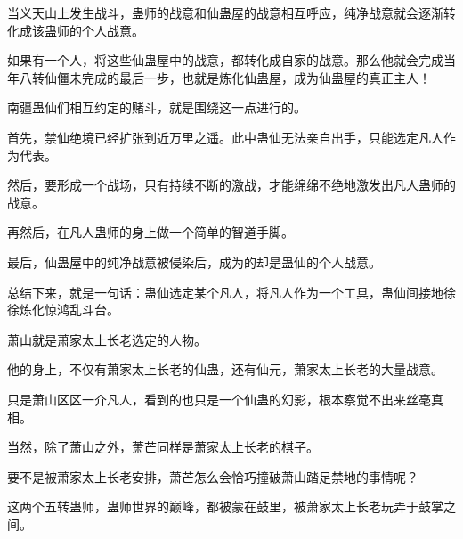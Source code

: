 \begin{this_body}
当义天山上发生战斗，蛊师的战意和仙蛊屋的战意相互呼应，纯净战意就会逐渐转化成该蛊师的个人战意。

如果有一个人，将这些仙蛊屋中的战意，都转化成自家的战意。那么他就会完成当年八转仙僵未完成的最后一步，也就是炼化仙蛊屋，成为仙蛊屋的真正主人！

南疆蛊仙们相互约定的赌斗，就是围绕这一点进行的。

首先，禁仙绝境已经扩张到近万里之遥。此中蛊仙无法亲自出手，只能选定凡人作为代表。

然后，要形成一个战场，只有持续不断的激战，才能绵绵不绝地激发出凡人蛊师的战意。

再然后，在凡人蛊师的身上做一个简单的智道手脚。

最后，仙蛊屋中的纯净战意被侵染后，成为的却是蛊仙的个人战意。

总结下来，就是一句话：蛊仙选定某个凡人，将凡人作为一个工具，蛊仙间接地徐徐炼化惊鸿乱斗台。

萧山就是萧家太上长老选定的人物。

他的身上，不仅有萧家太上长老的仙蛊，还有仙元，萧家太上长老的大量战意。

只是萧山区区一介凡人，看到的也只是一个仙蛊的幻影，根本察觉不出来丝毫真相。

当然，除了萧山之外，萧芒同样是萧家太上长老的棋子。

要不是被萧家太上长老安排，萧芒怎么会恰巧撞破萧山踏足禁地的事情呢？

这两个五转蛊师，蛊师世界的巅峰，都被蒙在鼓里，被萧家太上长老玩弄于鼓掌之间。

\end{this_body}

